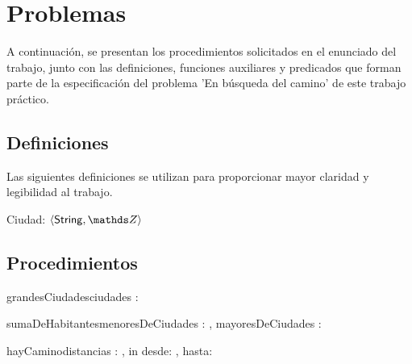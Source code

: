 \documentclass[10pt,a4paper]{article}
\newcommand{\ciudad}{\ensuremath{\langle \mathsf{String} , \ent \rangle}}
\newcommand{\matrizEnt}{\TLista{\TLista{\ent}}}
\begin{document}
\maketitle

\section{Problemas}
A continuación, se presentan los procedimientos solicitados en el enunciado del trabajo, junto con las definiciones, funciones auxiliares y predicados que forman parte de la especificación del problema 'En búsqueda del camino' de este trabajo práctico.

\subsection{Definiciones}
Las siguientes definiciones se utilizan para proporcionar mayor claridad y legibilidad al trabajo.

Ciudad:   \ciudad


\subsection{Procedimientos}


\begin{proc}{grandesCiudades}{\In ciudades : }{ }
\end{proc}

\begin{proc}{sumaDeHabitantes}{\In menoresDeCiudades : , \In mayoresDeCiudades : }{ }
\end{proc}

\begin{proc}{hayCamino}{\In distancias : \matrizEnt, in desde: \ent, hasta: \ent}{ \bool}
\end{proc}
\end{document}
